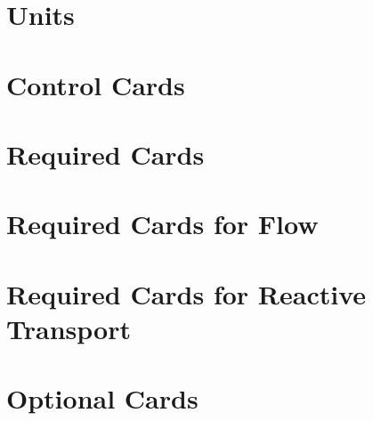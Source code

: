 \documentclass{beamer}
\begin{document}
\section{Units}


\section{Control Cards}



\section{Required Cards}








\section{Required Cards for Flow}


\section{Required Cards for Reactive Transport}




\section{Optional Cards}



\end{document}
